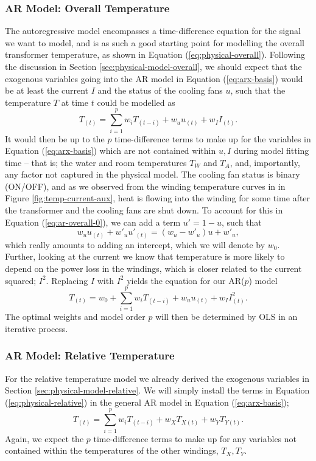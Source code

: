 \documentclass[]{article}
\begin{document}
\subsubsection{AR Model: Overall Temperature} \label{sec:ar-model-overall}
The autoregressive model encompasses a time-difference equation for the signal we want to model, and is as such a good starting point for modelling the overall transformer temperature, as shown in Equation (\ref{eq:physical-overall}). Following the discussion in Section \ref{sec:physical-model-overall}, we should expect that the exogenous variables going into the AR model in Equation (\ref{eq:arx-basis}) would be at least the current $I$ and the status of the cooling fans $u$, such that the temperature $T$ at time $t$ could be modelled as
\begin{equation} \label{eq:ar-overall-0}
	T_{(t)} = \sum_{i=1}^{p} w_i T_{(t-i)} + w_u u_{(t)} + w_{I} I_{(t)}.
\end{equation}
It would then be up to the $p$ time-difference terms to make up for the variables in Equation (\ref{eq:arx-basis}) which are not contained within $u,I$ during model fitting time -- that is; the water and room temperatures $T_W$ and $T_A$, and, importantly, any factor not captured in the physical model. The cooling fan status is binary (ON/OFF), and as we observed from the winding temperature curves in in Figure \ref{fig:temp-current-aux}, heat is flowing into the winding for some time after the transformer and the cooling fans are shut down. To account for this in Equation (\ref{eq:ar-overall-0}), we can add a term $u' = 1 - u$, such that
\begin{equation}
	w_u u_{(t)} + w'_{u} u'_{(t)} = (w_u - w'_{u})u + w'_{u},
\end{equation}
which really amounts to adding an intercept, which we will denote by $w_0$. Further, looking at the current we know that temperature is more likely to depend on the power loss in the windings, which is closer related to the current squared; $I^2$. Replacing $I$ with $I^2$ yields the equation for our AR($p$) model
\begin{equation} \label{eq:ar-overall-1}
	T_{(t)} = w_0 + \sum_{i=1}^{p} w_i T_{(t-i)} + w_u u_{(t)} + w_{I} I^2_{(t)}.
\end{equation}
The optimal weights and model order $p$ will then be determined by OLS in an iterative process.

\subsubsection{AR Model: Relative Temperature} \label{sec:ar-model-relative}
For the relative temperature model we already derived the exogenous variables in Section \ref{sec:physical-model-relative}. We will simply install the terms in Equation (\ref{eq:physical-relative}) in the general AR model in Equation (\ref{eq:arx-basis});
\begin{equation} \label{eq:ar-relative}
	T_{(t)} = \sum_{i=1}^{p} w_i T_{(t-i)} + w_X T_{X(t)} + w_Y T_{Y(t)}.
\end{equation}
Again, we expect the $p$ time-difference terms to make up for any variables not contained within the temperatures of the other windings, $T_X, T_Y$.
\end{document}
